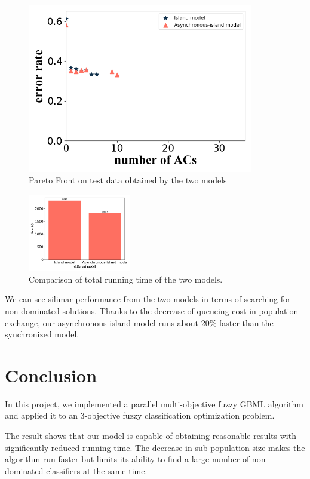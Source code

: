 \documentclass[conference]{IEEEtran}
\begin{document}
\begin{figure}[H]
\begin{minipage}[t]{0.25\textwidth}
    \includegraphics[width=0.88\textwidth]{figures/diffModelTest3.png}
    \end{minipage}
    \caption{Pareto Front on test data obtained by the two models}
    \label{diffModelT}
  \end{figure}


\begin{figure}[H]
  \centering
  \includegraphics[width=0.4\textwidth]{figures/diffModelTime.png}
  \caption{Comparison of total running time of the two models.}\label{diffModelTime}
\end{figure}

We can see silimar performance from the two models in terms of searching for non-dominated solutions. Thanks to the decrease of queueing cost in population exchange, our asynchronous island model runs about 20\% faster than the synchronized model.
 \section{Conclusion}
 In this project, we implemented a parallel multi-objective fuzzy GBML algorithm and applied it to an 3-objective fuzzy classification optimization problem.

 The result shows that our model is capable of obtaining reasonable results with significantly reduced running time. The decrease in sub-population size makes the algorithm run faster but limits its ability to find a large number of non-dominated classifiers at the same time. 
 
\end{document}
